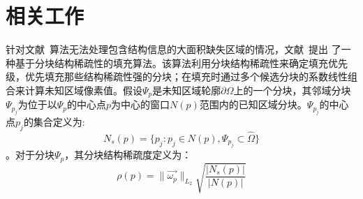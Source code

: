  \section{相关工作}
 \label{ch3:sec:related}
针对文献~算法无法处理包含结构信息的大面积缺失区域的情况，文献~提出 了一种基于分块结构稀疏性的填充算法。该算法利用分块结构稀疏性来确定填充优先级，优先填充那些结构稀疏性强的分块；在填充时通过多个候选分块的系数线性组合来计算未知区域像素值。假设$\Psi_p$是未知区域轮廓$\partial\Omega$上的一个分块，其邻域分块$\Psi_{p_{j}}$为位于以$\Psi_p$的中心点$p$为中心的窗口$N(p)$范围内的已知区域分块。$\Psi_{p_{j}}$的中心点$p_j$的集合定义为:
$$N_s(p)=\{p_j:p_j \in N(p) , \Psi_{p_{j}} \subset \hat{\Omega}\}$$。对于分块$\Psi_p$，其分块结构稀疏度定义为：
\begin{equation}\label{ch3:equ:sparsity}
\rho(p)=\|\vec{\omega_p}\|_{L_2}\sqrt{\frac{|N_s(p)|}{|N(p)|}}
\end{equation}

